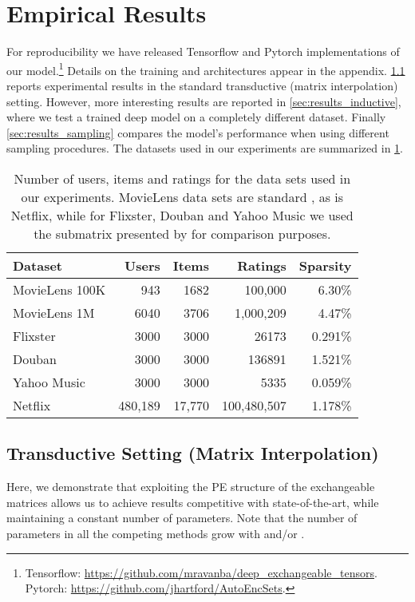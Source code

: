\documentclass{article}
\newcommand{\tablefontsmaller}{\fontfamily{cmss}\fontseries{uc}\fontsize{8pt}{7pt}\selectfont\centering}
\theoremstyle{definition}
\begin{document}
\section{Empirical Results}\label{sec:empirical}
For reproducibility we have released Tensorflow and Pytorch implementations of our model.\footnote{\noindent Tensorflow: \url{https://github.com/mravanba/deep_exchangeable_tensors}. Pytorch: \url{https://github.com/jhartford/AutoEncSets}.} 
Details on the training and architectures appear in the appendix. 
\cref{sec:results_trans} reports experimental results in the standard transductive (matrix interpolation)
setting. However, more interesting results are reported in \cref{sec:results_inductive}, where 
we test a trained deep model on a completely different dataset. Finally \cref{sec:results_sampling} compares the
model's performance when using different sampling procedures. The datasets used in our experiments are summarized in \cref{results:datasets}.

\begin{table}[h]
\tablefontsmaller
\begin{tabular}{l r r r r} 
\toprule
\textbf{Dataset} & \textbf{Users} & \textbf{Items} & \textbf{Ratings} & \textbf{Sparsity} \\ [0.5ex] 
\midrule
MovieLens 100K & 943 & 1682 & 100,000 & 6.30\% \\ 
MovieLens 1M & 6040 & 3706 & 1,000,209 & 4.47\%\\
Flixster & 3000& 3000& 26173  & 0.291\%\\
Douban & 3000& 3000& 136891 & 1.521\%\\
Yahoo Music& 3000& 3000 & 5335 & 0.059\%\\
Netflix & 480,189 & 17,770 & 100,480,507 & 1.178\%\\
\bottomrule
\end{tabular}
\caption {Number of users, items and ratings for the  data sets used in our experiments. MovieLens data sets are standard \citep{movielens}, as is Netflix, while for Flixster, Douban and Yahoo Music we used the  submatrix presented by \citep{monti_geomatrix} for comparison purposes.}\label{results:datasets}
\end{table}

\subsection{Transductive Setting (Matrix Interpolation)}\label{sec:results_trans}
Here, we demonstrate that exploiting the PE structure of the exchangeable matrices
allows us to achieve results competitive with state-of-the-art, 
while maintaining a constant number of parameters.
Note that the number of parameters in all the competing methods grow with  and/or .
\end{document}
